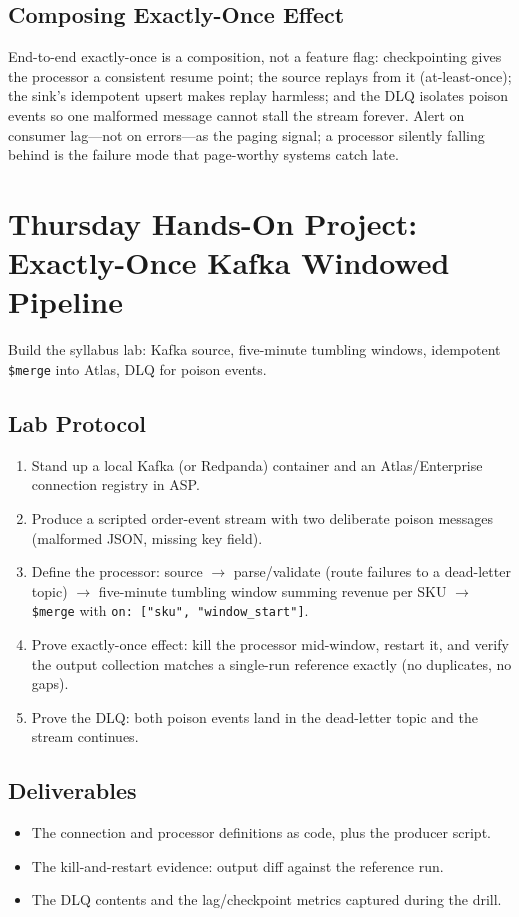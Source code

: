 \subsection{Composing Exactly-Once Effect}
End-to-end exactly-once is a composition, not a feature flag: checkpointing gives the processor a consistent resume point; the source replays from it (at-least-once); the sink's idempotent upsert makes replay harmless; and the DLQ isolates poison events so one malformed message cannot stall the stream forever. Alert on consumer lag---not on errors---as the paging signal; a processor silently falling behind is the failure mode that page-worthy systems catch late.

\section{Thursday Hands-On Project: Exactly-Once Kafka Windowed Pipeline}
Build the syllabus lab: Kafka source, five-minute tumbling windows, idempotent \texttt{\$merge} into Atlas, DLQ for poison events.

\subsection{Lab Protocol}
\begin{enumerate}
    \item Stand up a local Kafka (or Redpanda) container and an Atlas/Enterprise connection registry in ASP.
    \item Produce a scripted order-event stream with two deliberate poison messages (malformed JSON, missing key field).
    \item Define the processor: source $\to$ parse/validate (route failures to a dead-letter topic) $\to$ five-minute tumbling window summing revenue per SKU $\to$ \texttt{\$merge} with \texttt{on: ["sku", "window\_start"]}.
    \item Prove exactly-once effect: kill the processor mid-window, restart it, and verify the output collection matches a single-run reference exactly (no duplicates, no gaps).
    \item Prove the DLQ: both poison events land in the dead-letter topic and the stream continues.
\end{enumerate}

\subsection*{Deliverables}
\begin{itemize}
    \item The connection and processor definitions as code, plus the producer script.
    \item The kill-and-restart evidence: output diff against the reference run.
    \item The DLQ contents and the lag/checkpoint metrics captured during the drill.
\end{itemize}

